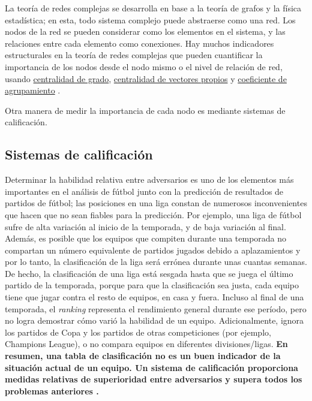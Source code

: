 La teoría de redes complejas se desarrolla en base a la teoría de grafos y la física estadística; en esta, 
todo sistema complejo puede abstraerse como una red. Los nodos de la red se pueden 
considerar como los elementos en el sistema, y las relaciones
entre cada elemento como conexiones. Hay muchos indicadores estructurales
en la teoría de redes complejas que pueden cuantificar la importancia de los nodos desde el nodo mismo o el
nivel de relación de red, usando \href{https://link.springer.com/10.1007%2F978-1-4419-9863-7_935}{centralidad de grado}, 
\href{https://neo4j.com/docs/graph-data-science/current/algorithms/eigenvector-centrality/}{centralidad de vectores propios} 
y \href{https://en.wikipedia.org/wiki/Clustering_coefficient}{coeficiente de agrupamiento} \cite{albert2002statistical}.
 


Otra manera de medir la importancia de cada nodo es mediante sistemas de calificación.

\subsection{Sistemas de calificación} \label{subsect:ratings}
Determinar la habilidad relativa entre adversarios es uno de los elementos
más importantes en el análisis de fútbol junto con la predicción de resultados de partidos de fútbol; las posiciones en 
una liga constan de numerosos inconvenientes que hacen que no sean fiables para la predicción. 
Por ejemplo, una liga de fútbol sufre de alta variación al inicio de la temporada, y de baja 
variación al final. Además, es posible que los equipos que compiten durante una temporada no
compartan un número equivalente de partidos jugados debido a aplazamientos y
por lo tanto, la clasificación de la liga será errónea durante unas cuantas semanas. De hecho, 
la clasificación de una liga está sesgada hasta que se juega el último partido de la temporada, porque
para que la clasificación sea justa, cada equipo tiene que jugar contra el resto de equipos, en
casa y fuera. Incluso al final de una temporada, el \textit{ranking} representa
el rendimiento general durante ese período, pero no logra
demostrar cómo varió la habilidad de un equipo. Adicionalmente,
ignora los partidos de Copa y los partidos de otras competiciones (por ejemplo, Champions
League), o no compara equipos en diferentes divisiones/ligas. \textbf{En
resumen, una tabla de clasificación no es un buen indicador de la situación actual de un equipo. Un 
sistema de calificación proporciona medidas relativas de superioridad entre adversarios y supera 
todos los problemas anteriores \cite{pi-ratings}.}

